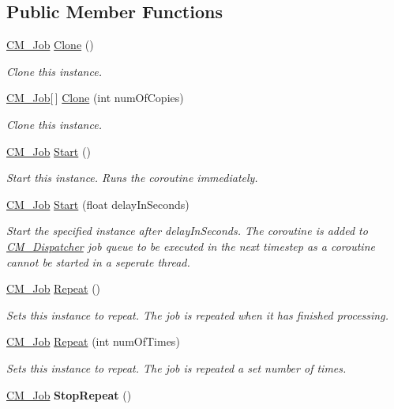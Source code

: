 \subsection*{Public Member Functions}
\begin{DoxyCompactItemize}
\item 
\hyperlink{class_c_m___job}{C\+M\+\_\+\+Job} \hyperlink{class_c_m___job_a7821bb2da3f3c9b30e171595a48aba7d}{Clone} ()
\begin{DoxyCompactList}\small\item\em Clone this instance. \end{DoxyCompactList}\item 
\hyperlink{class_c_m___job}{C\+M\+\_\+\+Job}\mbox{[}$\,$\mbox{]} \hyperlink{class_c_m___job_a1b1cd4972a357665fb21d20f58018b1e}{Clone} (int num\+Of\+Copies)
\begin{DoxyCompactList}\small\item\em Clone this instance. \end{DoxyCompactList}\item 
\hyperlink{class_c_m___job}{C\+M\+\_\+\+Job} \hyperlink{class_c_m___job_a54fd4dbd315708b9acd2a09f7096a554}{Start} ()
\begin{DoxyCompactList}\small\item\em Start this instance. Runs the coroutine immediately. \end{DoxyCompactList}\item 
\hyperlink{class_c_m___job}{C\+M\+\_\+\+Job} \hyperlink{class_c_m___job_a8c43918a2c837fe98cef1884da11836f}{Start} (float delay\+In\+Seconds)
\begin{DoxyCompactList}\small\item\em Start the specified instance after delay\+In\+Seconds. The coroutine is added to \hyperlink{class_c_m___dispatcher}{C\+M\+\_\+\+Dispatcher} job queue to be executed in the next timestep as a coroutine cannot be started in a seperate thread. \end{DoxyCompactList}\item 
\hyperlink{class_c_m___job}{C\+M\+\_\+\+Job} \hyperlink{class_c_m___job_a5b083485bb5892b17e180ff646a68a78}{Repeat} ()
\begin{DoxyCompactList}\small\item\em Sets this instance to repeat. The job is repeated when it has finished processing. \end{DoxyCompactList}\item 
\hyperlink{class_c_m___job}{C\+M\+\_\+\+Job} \hyperlink{class_c_m___job_a25e1a04eb72396ed2bf2b142d074d311}{Repeat} (int num\+Of\+Times)
\begin{DoxyCompactList}\small\item\em Sets this instance to repeat. The job is repeated a set number of times. \end{DoxyCompactList}\item 
\hypertarget{class_c_m___job_a3a7cfe0528790ce973e44c003a724459}{}\hyperlink{class_c_m___job}{C\+M\+\_\+\+Job} {\bfseries Stop\+Repeat} ()\label{class_c_m___job_a3a7cfe0528790ce973e44c003a724459}


\end{DoxyCompactItemize}
